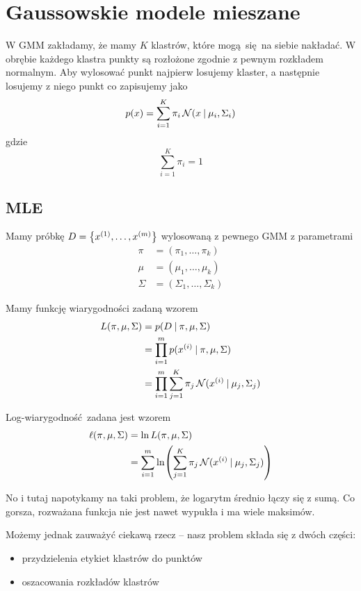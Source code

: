 \section{Gaussowskie modele mieszane}

W GMM zakładamy, że mamy \( K \) klastrów, które mogą się na siebie nakładać.
W obrębie każdego klastra punkty są rozłożone zgodnie z pewnym rozkładem normalnym.
Aby wylosować punkt najpierw losujemy klaster, a następnie losujemy z niego punkt co zapisujemy jako
\[
    p(x) = \sum_{i=1}^K \pi_i \operatorname{\mathcal{N}}(x \:\vert\: \mu_i, \Sigma_i)
\]
gdzie
\[
    \sum_{i=1}^K \pi_i = 1
\]

\subsection{MLE}

Mamy próbkę \( D = \set{x^{(1)}, \dots, x^{(m)}} \) wylosowaną z pewnego GMM z parametrami
\begin{align*}
    \pi &= (\pi_1, \dots, \pi_k) \\
    \mu &= (\mu_1, \dots, \mu_k) \\
    \Sigma &= (\Sigma_1, \dots, \Sigma_k)
\end{align*}

Mamy funkcję wiarygodności zadaną wzorem
\begin{align*}
    L(\pi, \mu, \Sigma) 
        &= p(D \:\vert\: \pi, \mu, \Sigma) \\
        &= \prod_{i=1}^m p(x^{(i)} \:\vert\: \pi, \mu, \Sigma) \\
        &= \prod_{i=1}^m \sum_{j=1}^K \pi_j\operatorname{\mathcal{N}}(x^{(i)} \:\vert\: \mu_j, \Sigma_j)
\end{align*}

Log-wiarygodność zadana jest wzorem
\begin{align*}
    \ell(\pi, \mu, \Sigma)
        &= \ln L(\pi, \mu, \Sigma) \\
        &= \sum_{i=1}^m \ln \pars{\sum_{j=1}^K \pi_j\Normal(x^{(i)} \given \mu_j, \Sigma_j)}
\end{align*}

No i tutaj napotykamy na taki problem, że logarytm średnio łączy się z sumą. 
Co gorsza, rozważana funkcja nie jest nawet wypukła i ma wiele maksimów.

Możemy jednak zauważyć ciekawą rzecz -- nasz problem składa się z dwóch części:
\begin{itemize}
    \item przydzielenia etykiet klastrów do punktów
    \item oszacowania rozkładów klastrów
\end{itemize}


